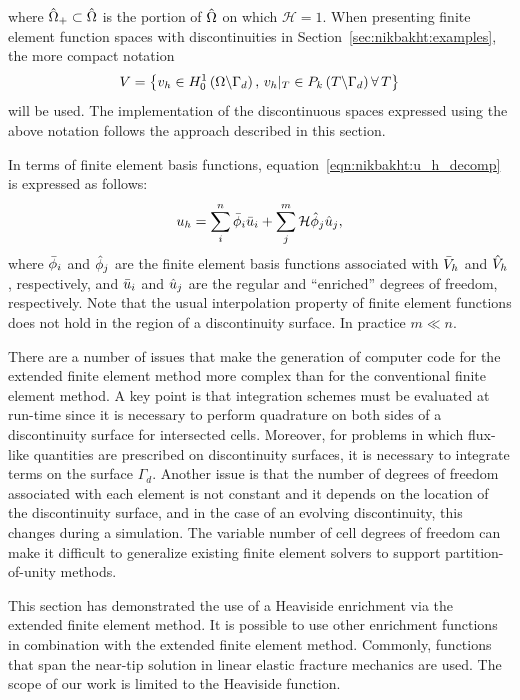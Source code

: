 %
where $\Hat{\Omega}_{+} \subset \Hat{\Omega}$ is the portion of
$\Hat{\Omega}$ on which $\mathcal{H} = 1$.
When presenting finite element function spaces
with discontinuities in Section~\ref{sec:nikbakht:examples}, the more compact
notation
%
\begin{equation}
  V = \left\{ {v_{h} \in H_{0}^{1}\left( {\Omega \backslash \Gamma_{d}} \right), \,
          v_{h}|_{T} \in P_{k}\left( {T \backslash \Gamma_{d}} \right) \forall\, T} \right\}
\end{equation}
%
will be used. The implementation of the discontinuous spaces expressed
using the above notation follows the approach described in this section.

In terms of finite element basis functions,
equation~\eqref{eqn:nikbakht:u_h_decomp} is expressed as follows:
%
\begin{equation}
  u_{h} = \sum_{i}^{n} \Bar{\phi}_{i} \Bar{u}_{i}
    + \sum_{j}^{m} \mathcal{H} \Hat{\phi}_{j} \Hat{u}_{j},
\label{eqn:nikbakht:basis_decomp}
\end{equation}
%
where $\Bar{\phi}_{i}$ and $\Hat{\phi}_{j}$ are the finite element basis
functions associated with $\Bar{V}_{h}$ and $\Hat{V}_{h}$, respectively,
and $\Bar{u}_{i}$ and $\Hat{u}_{j}$ are the regular and ``enriched'' degrees
of freedom, respectively. Note that the usual interpolation property
of finite element functions does not hold in the region of a discontinuity
surface. In practice $m \ll n$.

There are a number of issues that make the generation of computer
code for the extended finite element method more complex than for the
conventional finite element method.  A key point is that integration
schemes must be evaluated at run-time since it is necessary to perform
quadrature on both sides of a discontinuity surface for intersected cells.
Moreover, for problems in which flux-like quantities are prescribed
on discontinuity surfaces, it is necessary to integrate terms on the
surface $\Gamma_{d}$.  Another issue is that the number of degrees of
freedom associated with each element is not constant and it depends on
the location of the discontinuity surface, and in the case of an evolving
discontinuity, this changes during a simulation.  The variable number
of cell degrees of freedom can make it difficult to generalize existing
finite element solvers to support partition-of-unity methods.

This section has demonstrated the use of a Heaviside enrichment via the
extended finite element method. It is possible to use other enrichment
functions in combination with the extended finite element method.
Commonly, functions that span the near-tip solution in linear elastic
fracture mechanics are used.  The scope of our work is limited to the
Heaviside function.
